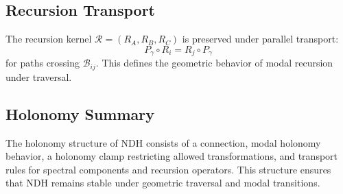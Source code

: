 \subsection{Recursion Transport}

The recursion kernel $\mathcal{R} = (R_A, R_B, R_C)$ is preserved under parallel
transport:
\[
P_\gamma \circ R_i = R_j \circ P_\gamma
\]
for paths crossing $\mathcal{B}_{ij}$. This defines the geometric behavior of
modal recursion under traversal.

\subsection{Holonomy Summary}

The holonomy structure of NDH consists of a connection, modal holonomy behavior,
a holonomy clamp restricting allowed transformations, and transport rules for
spectral components and recursion operators. This structure ensures that NDH
remains stable under geometric traversal and modal transitions.
